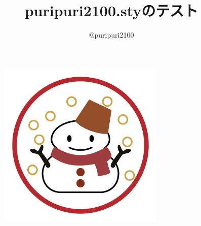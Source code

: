 \documentclass{jsarticle}
\begin{document}
\title{\textsf{puripuri2100.sty}のテスト}
\author{@puripuri2100}
\date{\puritoday}
\maketitle


\begin{figure}[h]
\centering
\includegraphics[width=80mm]{aki.jpg}
\end{figure}
\end{document}
